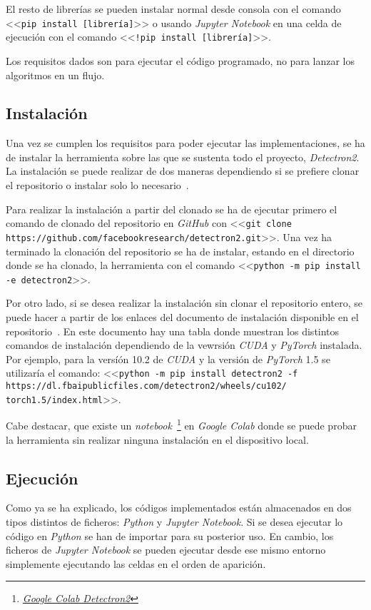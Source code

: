 El resto de librerías se pueden instalar normal desde consola con el comando <<\texttt{pip install [librería]}>> o usando \textit{Jupyter Notebook} en una celda de ejecución con el comando <<\texttt{!pip install [librería]}>>.

Los requisitos dados son para ejecutar el código programado, no para lanzar los algoritmos en un flujo.

\subsection{Instalación}
Una vez se cumplen los requisitos para poder ejecutar las implementaciones, se ha de instalar la herramienta sobre las que se sustenta todo el proyecto, \textit{Detectron2}. La instalación se puede realizar de dos maneras dependiendo si se prefiere clonar el repositorio o instalar solo lo necesario~\cite{inst}.

Para realizar la instalación a partir del clonado se ha de ejecutar primero el comando de clonado del repositorio en \textit{GitHub} con <<\texttt{git clone https://github.com/facebookresearch/detectron2.git}>>. Una vez ha terminado la clonación del repositorio se ha de instalar, estando en el directorio donde se ha clonado, la herramienta con el comando <<\texttt{python -m pip install -e detectron2}>>.

Por otro lado, si se desea realizar la instalación sin clonar el repositorio entero, se puede hacer a partir de los enlaces del documento de instalación disponible en el repositorio~\cite{inst}. En este documento hay una tabla donde muestran los distintos comandos de instalación dependiendo de la vewrsión \textit{CUDA} y \textit{PyTorch} instalada. Por ejemplo, para la versíón 10.2 de \textit{CUDA} y la versión de \textit{PyTorch} 1.5 se utilizaría el comando: <<\texttt{python -m pip install detectron2 -f https://dl.fbaipublicfiles.com/detectron2/wheels/cu102/\\torch1.5/index.html}>>.

Cabe destacar, que existe un \textit{notebook}~\footnote{\href{https://colab.research.google.com/drive/16jcaJoc6bCFAQ96jDe2HwtXj7BMD_-m5}{\textit{Google Colab Detectron2}}} en \textit{Google Colab} donde se puede probar la herramienta sin realizar ninguna instalación en el dispositivo local.

\subsection{Ejecución}
Como ya se ha explicado, los códigos implementados están almacenados en dos tipos distintos de ficheros: \textit{Python} y \textit{Jupyter Notebook}. Si se desea ejecutar lo código en \textit{Python} se han de importar para su posterior uso. En cambio, los ficheros de \textit{Jupyter Notebook} se pueden ejecutar desde ese mismo entorno simplemente ejecutando las celdas en el orden de aparición.

